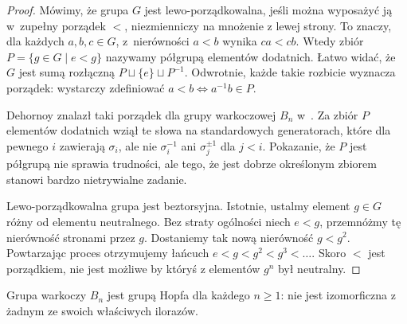 \begin{proof}
    Mówimy, że grupa $G$ jest lewo-porządkowalna, jeśli można wyposażyć ją w~zupełny porządek $<$, niezmienniczy na mnożenie z lewej strony.
    To znaczy, dla każdych $a, b, c \in G$, z~nierówności $a < b$ wynika $ca < cb$.
    Wtedy zbiór $P = \{g \in G \mid e < g\}$ nazywamy półgrupą elementów dodatnich.
    Łatwo widać, że $G$ jest sumą rozłączną $P \sqcup \{e\} \sqcup P^{-1}$.
    Odwrotnie, każde takie rozbicie wyznacza porządek: wystarczy zdefiniować $a < b \iff a^{-1}b \in P$.

    Dehornoy znalazł taki porządek dla grupy warkoczowej $B_n$ w~\cite{dehornoy94}.
    Za zbiór $P$ elementów dodatnich wziął te słowa na standardowych generatorach, które dla pewnego $i$ zawierają $\sigma_i$, ale nie $\sigma_i^{-1}$ ani $\sigma_j^{\pm 1}$ dla $j < i$.
    Pokazanie, że $P$ jest półgrupą nie sprawia trudności, ale tego, że jest dobrze określonym zbiorem stanowi bardzo nietrywialne zadanie.

    Lewo-porządkowalna grupa jest beztorsyjna.
    Istotnie, ustalmy element $g \in G$ różny od elementu neutralnego.
    Bez straty ogólności niech $e < g$, przemnóżmy tę nierówność stronami przez $g$.
    Dostaniemy tak nową nierówność $g < g^2$.
    Powtarzając proces otrzymujemy łańcuch $e < g < g^2 < g^3 < \ldots$.
    Skoro $<$ jest porządkiem, nie jest możliwe by któryś z elementów $g^n$ był neutralny.
\end{proof}

\begin{proposition}
    Grupa warkoczy $B_n$ jest grupą Hopfa dla każdego $n \ge 1$: nie jest izomorficzna z żadnym ze swoich właściwych ilorazów.
\end{proposition}

